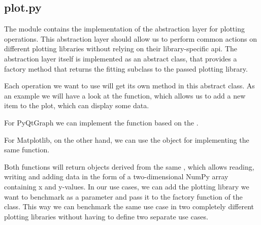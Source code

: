 \subsection{plot.py}

The module  contains the implementation
of the abstraction layer for plotting operations. This abstraction layer should
allow us to perform common actions on different plotting libraries without
relying on their library-specific \gls{api}. The abstraction layer itself is
implemented as an abstract class, that provides a factory method that returns
the fitting subclass to the passed plotting library.



Each operation we want to use will get its own method in this abstract class. As
an example we will have a look at the  function,
which allows us to add a new item to the plot, which can display some data.



For PyQtGraph we can implement the  function based on the .



For Matplotlib, on the other hand, we can use the 
object for implementing the same function.



Both functions will return objects derived from the same
, which allows reading, writing and adding
data in the form of a two-dimensional NumPy array containing x and y-values. In our
use cases, we can add the plotting library we want to benchmark as a parameter
and pass it to the factory function  of the
 class. This way we can benchmark the 
same use case in two completely different plotting libraries without having to
define two separate use cases.





